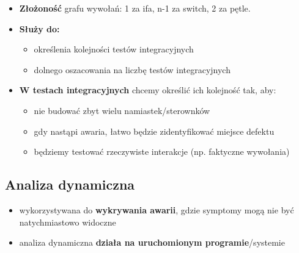 \documentclass[../main.tex]{subfiles}
\begin{document}
\begin{itemize}
\begin{itemize}
            \item \textbf{Złożoność} grafu wywołań: 1 za ifa, n-1 za switch, 2 za pętle.

            \item \textbf{Służy do:}
            \begin{itemize}
                \item określenia kolejności testów integracyjnych
                \item dolnego oszacowania na liczbę testów integracyjnych
            \end{itemize}

            \item \textbf{W testach integracyjnych} chcemy określić ich kolejność tak, aby:
            \begin{itemize}
                \item nie budować zbyt wielu namiastek/sterownków
                \item gdy nastąpi awaria, łatwo będzie zidentyfikować miejsce defektu
                \item będziemy testować rzeczywiste interakcje (np. faktyczne wywołania)
            \end{itemize}
        \end{itemize}
    \end{itemize}

    \subsection{Analiza dynamiczna}
    \begin{itemize}
        \item wykorzystywana do \textbf{wykrywania awarii}, gdzie symptomy mogą nie być natychmiastowo widoczne
        \item analiza dynamiczna \textbf{działa na uruchomionym programie}/systemie
    \end{itemize}
\end{document}
